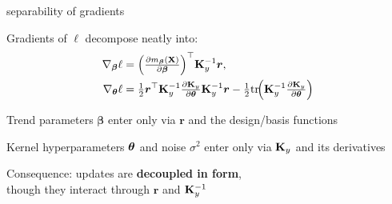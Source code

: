 \documentclass[11pt,compress,t,notes=noshow, xcolor=table]{beamer}
\begin{document}
\begin{framei}[sep=L]{separability of gradients}
\item Gradients of $\ell$ decompose neatly into:
\begin{align*}
\nabla_{\bm{\beta}} \ell &= 
\Big(\tfrac{\partial m_{\bm{\beta}}(\mathbf{X})}{\partial \bm{\beta}}\Big)^\top \mathbf{K}_y^{-1}\bm{r}, \\
\nabla_{\bm{\theta}} \ell &= 
\tfrac{1}{2}\bm{r}^\top \mathbf{K}_y^{-1}\tfrac{\partial \mathbf{K}_y}{\partial\bm{\theta}}\mathbf{K}_y^{-1}\bm{r}
- \tfrac{1}{2}\mathrm{tr}\!\Big(\mathbf{K}_y^{-1}\tfrac{\partial \mathbf{K}_y}{\partial \bm{\theta}}\Big)
\end{align*}
\item Trend parameters $\bm{\beta}$ enter only via $\bm{r}$ and the design/basis functions
\item Kernel hyperparameters $\bm{\theta}$ and noise $\sigma^2$ enter only via $\mathbf{K}_y$ and its derivatives
\item Consequence: updates are \textbf{decoupled in form}, \\though they interact through $\bm{r}$ and $\mathbf{K}_y^{-1}$
\end{framei}



\endlecture
\end{document}
